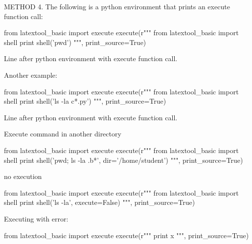 METHOD 4.
The following is a python environment that prints an execute function call:
\begin{python}
from latextool_basic import execute
execute(r"""
from latextool_basic import shell
print shell('pwd')
""", print_source=True)
\end{python}
Line after python environment with execute function call.

Another example:
\begin{python}
from latextool_basic import execute
execute(r"""
from latextool_basic import shell
print shell('ls -la c*.py')
""", print_source=True)
\end{python}
Line after python environment with execute function call.

Execute command in another directory
\begin{python}
from latextool_basic import execute
execute(r"""
from latextool_basic import shell
print shell('pwd; ls -la .b*', dir='/home/student')
""", print_source=True)
\end{python}

no execution
\begin{python}
from latextool_basic import execute
execute(r"""
from latextool_basic import shell
print shell('ls -la', execute=False)
""", print_source=True)
\end{python}


Executing with error:
\begin{python}
from latextool_basic import execute
execute(r"""
print x
""", print_source=True)
\end{python}

